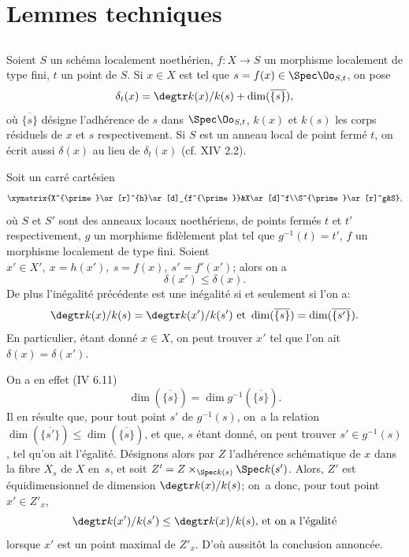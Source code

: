 \section{Lemmes techniques} \label{XIV.2}

\subsection{} \label{XIV.2.1}
Soient $S$ un sch\'ema localement noeth\'erien, $f:X\to S$ un morphisme localement de type fini, $t$ un point de $S$. Si $x\in X$ est tel que $s=f(x)\in\Spec\Oo_{S, t}$, on pose
$$
\delta_t(x)=\degtr k(x)/k(s)+\dim(\overline{\{s\}}),
$$
o\`u $\overline{\{s\}}$ d\'esigne l'adh\'erence de $s$ dans $\Spec\Oo_{S, t}$, $k(x)$ et $k(s)$ les corps r\'esiduels de $x$ et $s$ respectivement. Si $S$ est un anneau local de point ferm\'e $t$, on \'ecrit aussi $\delta(x)$ au lieu de $\delta_t(x)$ (cf.  XIV 2.2).
\begin{sublemme} \label{XIV.2.1.1} Soit un carr\'e cart\'esien
$$
\xymatrix{X^{\prime}\ar[r]^{h}\ar[d]_{f^{\prime}}&X\ar[d]^f\\S^{\prime}\ar[r]^g&S},
$$
o\`u $S$ et $S'$ sont des anneaux locaux noeth\'eriens, de points ferm\'es $t$ et $t'$ respectivement, $g$ un morphisme fid\`element plat tel que $g^{-1}(t)=t'$, $f$ un morphisme localement de type fini. Soient $x'\in X',\ x=h(x'),\ s=f(x),\ s'=f'(x')$; alors on a
$$
\delta(x')\leq\delta(x).
$$
De plus l'in\'egalit\'e pr\'ec\'edente est une in\'egalit\'e si et seulement si l'on a:
$$
\degtr k(x)/k(s)=\degtr k(x')/k(s')\text{ et }\dim(\overline{\{s\}})=\dim(\overline{\{s'\}}).
$$
En particulier, \'etant donn\'e $x\in X$, on peut trouver $x'$ tel que l'on ait $\delta(x)=\delta(x')$.
\end{sublemme}

On a en effet (\EGA IV 6.11)
$$
\dim(\overline{\{s\}})=\dim g^{-1}(\overline{\{s\}}).
$$
Il en r\'esulte que, pour tout point $s'$ de $g^{-1}(s)$, on~a la relation $\dim(\overline{\{s'\}})\leq \dim(\overline{\{s\}})$, et que, $s$ \'etant donn\'e, on peut trouver $s'\in g^{-1}(s)$, tel qu'on ait l'\'egalit\'e. D\'esignons alors par $Z$ l'adh\'erence sch\'ematique de $x$ dans la fibre $X_s$ de $X$ en~$s$, et soit $Z'=Z\times_{\Spec k(s)}\Spec k(s')$. Alors, $Z'$ est \'equidimensionnel de dimension $\degtr k(x)/k(s)$; on~a donc, pour tout point $x'\in Z'_{x}$,
$$
\degtr k(x')/k(s')\leq\degtr k(x)/k(s)\text{, et on~a l'égalité}$$
lorsque $x'$ est un point maximal de $Z'_x$. D'o\`u aussit\^{o}t la conclusion annonc\'ee.

